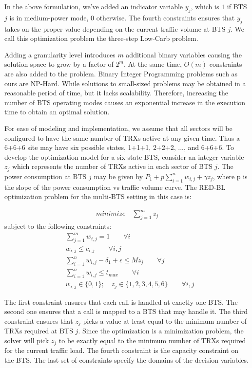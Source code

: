 In the above formulation, we've added an indicator variable $y_j$, which is $1$ if BTS $j$ is in medium-power mode, $0$ otherwise. The fourth constraints ensures that $y_j$ takes on the proper value depending on the current traffic volume at BTS $j$. We call this optimization problem the three-step Low-Carb problem.

Adding a granularity level introduces $m$ additional binary variables causing the solution space to grow by a factor of $2^m$. At the same time, $O(m)$ constraints are also added to the problem. Binary Integer Programming problems such as ours are NP-Hard. While solutions to small-sized problems may be obtained in a reasonable period of time, but it lacks scalability. Therefore, increasing the number of BTS operating modes causes an exponential increase in the execution time to obtain an optimal solution. 

For ease of modeling and implementation, we assume that all sectors will be configured to have the same number of TRXs active at any given time. Thus a 6+6+6 site may have six possible states, 1+1+1, 2+2+2, ..., and 6+6+6. To develop the optimization model for a six-state BTS, consider an integer variable $z_j$ which represents the number of TRXs active in each sector of BTS $j$. The power consumption at BTS $j$ may be given by $P_1 + p \sum_{i=1}^{n} w_{i,j} + \gamma z_j$, where p is the slope of the power consumption vs traffic volume curve. The RED-BL optimization problem for the multi-BTS setting in this case is:

\begin{align}
\textit{minimize} \quad \sum_{j=1}^{m} z_j
\end{align}
subject to the following constraints:
\begin{align}
& \sum_{j=1}^m w_{i,j} = 1 \qquad \forall i \\
& w_{i,j} \leq c_{i,j} \qquad \forall i, j \\
& \sum_{i=1}^nw_{i,j}-\delta_1 +\epsilon \leq Mz_j \qquad \forall j \\
& \sum_{i=1}^n w_{i,j} \le t_{max} \qquad \forall i \\
& w_{i,j} \in \{0,1\}; \quad z_j \in \{1,2,3,4,5,6\}\qquad \forall i, j%
\end{align}

The first constraint ensures that each call is handled at exactly one BTS. The second one ensures that a call is mapped to a BTS that may handle it. The third constraint ensures that $z_j$ picks a value at least equal to the minimum number of TRXs required at BTS $j$. Since the optimization is a minimization problem, the solver will pick $z_j$ to be exactly equal to the minimum number of TRXs required for the current traffic load. The fourth constraint is the capacity constraint on the BTS. The last set of constraints specify the domains of the decision variables.

